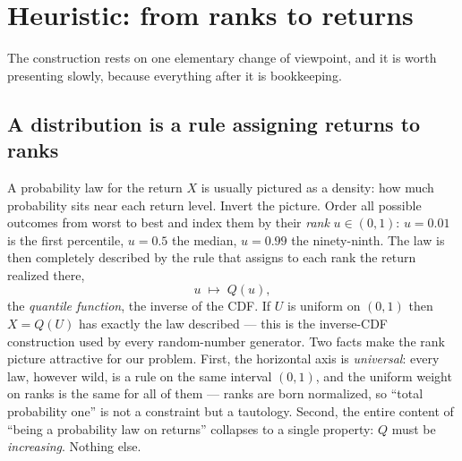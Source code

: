 \section{Heuristic: from ranks to returns}
\label{sec:heuristic}

The construction rests on one elementary change of viewpoint, and it is
worth presenting slowly, because everything after it is bookkeeping.

\subsection{A distribution is a rule assigning returns to ranks}

A probability law for the return $X$ is usually pictured as a density: how
much probability sits near each return level.  Invert the picture.  Order
all possible outcomes from worst to best and index them by their
\emph{rank} $u\in(0,1)$: $u=0.01$ is the first percentile, $u=0.5$ the
median, $u=0.99$ the ninety-ninth.  The law is then completely described by
the rule that assigns to each rank the return realized there,
\begin{equation}
u\;\longmapsto\;Q(u),
\label{eq:Qdef}
\end{equation}
the \emph{quantile function}, the inverse of the CDF.  If $U$ is uniform on
$(0,1)$ then $X=Q(U)$ has exactly the law described --- this is the
inverse-CDF construction used by every random-number generator.  Two facts
make the rank picture attractive for our problem.  First, the horizontal
axis is \emph{universal}: every law, however wild, is a rule on the same
interval $(0,1)$, and the uniform weight on ranks is the same for all of
them --- ranks are born normalized, so ``total probability one'' is not a
constraint but a tautology.  Second, the entire content of ``being a
probability law on returns'' collapses to a single property: $Q$ must be
\emph{increasing}.  Nothing else.

